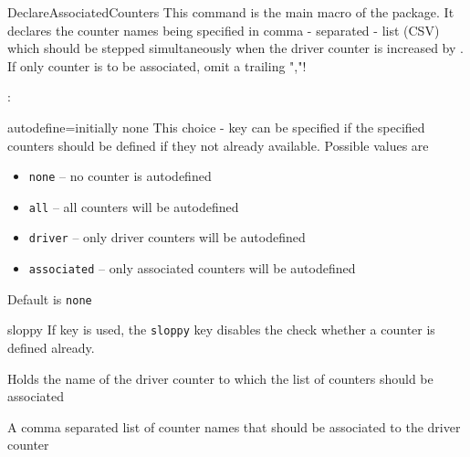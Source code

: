 \documentclass[12pt,a4paper,oneside]{article}
\def\packageversion{\xassoccntpackageversion}%
\begin{document}
\begin{docCommand}{DeclareAssociatedCounters}{}
This command is the main macro of the package. It declares the counter names being specified in comma - separated - list (CSV) which should be stepped simultaneously when the driver counter is increased by . If only counter is to be associated, omit a trailing ","! 


\begin{codeoptionsenum}
  \item {}: %
    \begin{docKey}[][]{autodefine}{=}{initially none}
      This choice - key can be specified if the specified counters should be defined if they not already available.
      Possible values are
      \begin{itemize}
        \item \texttt{none} -- no counter is autodefined
        \item \texttt{all} -- all counters will be autodefined          
        \item \texttt{driver} -- only driver counters will be autodefined          
        \item \texttt{associated} -- only associated counters will be autodefined          
        \end{itemize}	
      \end{docKey}
      Default is \texttt{none}
      \begin{docKey}[][]{sloppy}{}{}
        If  key is used, the \texttt{sloppy} key disables the check whether a counter is defined already. 
      \end{docKey}

  \item {} 

    Holds the name of the driver counter to which the list of counters should be associated
\item {}

  A comma separated list of counter names that should be associated to the driver counter
\end{codeoptionsenum}



\end{docCommand}
\end{document}
